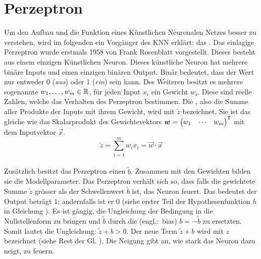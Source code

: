 \section{Perzeptron}
Um den Aufbau und die Funktion eines Künstlichen Neuronalen Netzes besser zu
verstehen, wird im folgenden ein Vorgänger des KNN erklärt: das .
\para{}
Das einlagige Perzeptron wurde erstmals 1958 von Frank Rosenblatt vorgestellt. Dieses
besteht aus einem einzigen Künstlichen Neuron. Dieses künstliche Neuron
hat mehrere binäre Inputs und einen einzigen binären Output. Binär
bedeutet, dass der Wert nur entweder 0 (\textit{aus}) oder 1 (\textit{ein}) sein
kann. Des Weiteren besitzt es mehrere sogenannte  $w_1, \ldots,
w_m \in \mathbb{R}$, für jeden Input $x_i$ ein Gewicht $w_i$.
Diese sind reelle Zahlen, welche das Verhalten des Perzeptron bestimmen.
Die , also die Summe aller Produkte der Inputs mit
ihrem Gewicht, wird mit $\tilde{z}$ bezeichnet.
Sie ist das gleiche wie das Skalarprodukt des Gewichtevektors
$\bm{w} = \begin{pmatrix} w_1 & \cdots & w_m \end{pmatrix}^{\mathsf{T}}$ mit dem
Inputvektor $\vec{x}$. \\
\begin{equation*}
  \tilde{z} = \sum_{i=1}^{m} w_i x_i = \vec{w} \cdot \vec{x}
\end{equation*} \\
Zusätzlich besitzt das Perzeptron einen  $\tilde{b}$.
Zusammen mit den Gewichten bilden sie die Modellparameter.
Das Perzeptron verhält sich so, dass falls die gewichtete Summe $\tilde{z}$ grösser als der
Schwellenwert $\tilde{b}$ ist, das Neuron feuert. Das bedeutet der Output beträgt 1;
andernfalls ist er 0 (siehe erster Teil der Hypothesenfunktion $h$ in Gleichung ).
Es ist gängig, die Ungleichung der Bedingung in die Nullstellenform zu bringen
und $\tilde{b}$ durch die  (engl.:\ bias)
$b = -\tilde{b}$ zu ersetzten. Somit lautet die Ungleichung: $\tilde{z} + b
> 0$. Der neue Term $\tilde{z} + b$ wird mit $z$ bezeichnet (siehe Rest der Gl. ).
Die Neigung gibt an, wie stark das Neuron dazu neigt, zu feuern.\\

